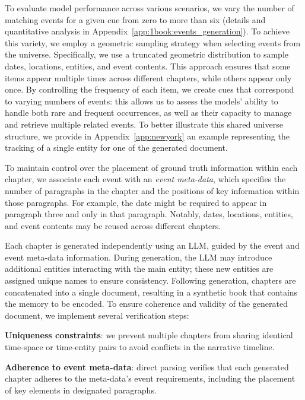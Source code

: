 \documentclass{article}
\begin{document}
To evaluate model performance across various scenarios, we vary the number of matching events for a given cue from zero to more than six (details and quantitative analysis in Appendix~\ref{app:1book:events_generation}). To achieve this variety, we employ a geometric sampling strategy when selecting events from the universe. Specifically, we use a truncated geometric distribution to sample dates, locations, entities, and event contents. This approach ensures that some items appear multiple times across different chapters, while others appear only once. By controlling the frequency of each item, we create cues that correspond to varying numbers of events: this allows us to assess the models' ability to handle both rare and frequent occurrences, as well as their capacity to manage and retrieve multiple related events.
To better illustrate this shared universe structure, we provide in Appendix~\ref{app:newyork} an example representing the tracking of a single entity for one of the generated document.

To maintain control over the placement of ground truth information within each chapter, we associate each event with an \emph{event meta-data}, which specifies the number of paragraphs in the chapter and the positions of key information within those paragraphs. For example, the date might be required to appear in paragraph three and only in that paragraph. Notably, dates, locations, entities, and event contents may be reused across different chapters.

Each chapter is generated independently using an LLM, guided by the event and event meta-data information. 
During generation, the LLM may introduce additional entities interacting with the main entity; these new entities are assigned unique names to ensure consistency. Following generation, chapters are concatenated into a single document, resulting in a synthetic book that contains the memory to be encoded.
%
To ensure coherence and validity of the generated document, we implement several verification steps:

\textbf{Uniqueness constraints}: we prevent multiple chapters from sharing identical time-space or time-entity pairs to avoid conflicts in the narrative timeline.

\textbf{Adherence to event meta-data}: 
direct parsing verifies that each generated chapter adheres to the meta-data's event requirements, including the placement of key elements in designated paragraphs.
\end{document}
